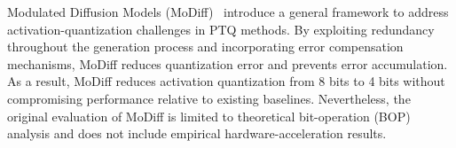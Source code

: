 
Modulated Diffusion Models (MoDiff)~\citep{gao2025modulateddiffusionacceleratinggenerative} introduce a general framework to address activation-quantization challenges in PTQ methods. By exploiting redundancy throughout the generation process and incorporating error compensation mechanisms, MoDiff reduces quantization error and prevents error accumulation. As a result, MoDiff reduces activation quantization from 8 bits to 4 bits without compromising performance relative to existing baselines. Nevertheless, the original evaluation of MoDiff is limited to theoretical bit-operation (BOP) analysis and does not include empirical hardware-acceleration results.


